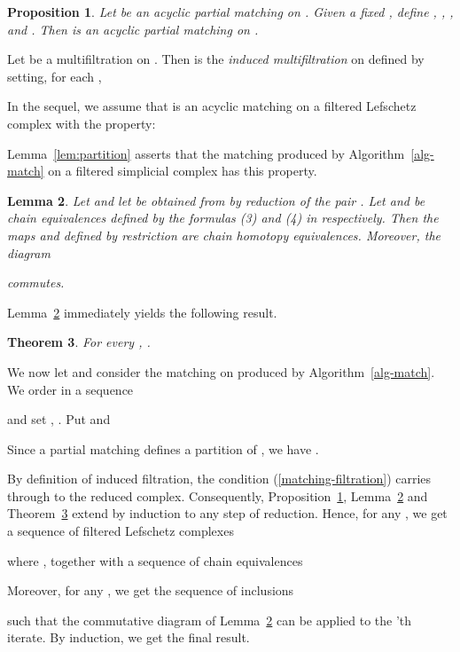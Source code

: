 \documentclass[12pt]{article}
\newtheorem{thm}{Theorem}[section]
\newtheorem{lem}[thm]{Lemma}
\newtheorem{prop}[thm]{Proposition}
\begin{document}
\begin{prop}\label{prop:reduced-matching}
Let   be an acyclic partial matching on . Given a fixed ,
define ,
, , and .
Then  is an acyclic partial matching on .
\end{prop}

Let  be a multifiltration on . Then  is the {\em induced multifiltration} on
 defined by setting, for each ,


In the sequel, we assume that  is an acyclic matching on a filtered Lefschetz complex  with the property:



Lemma~\ref{lem:partition} asserts that the matching produced by Algorithm~\ref{alg-match} on a filtered simplicial complex  has this property.

\begin{lem}\label{lem:chain-equivalence} Let  and let  be obtained from  by reduction of the pair .
Let  and  be chain equivalences defined by the formulas (3) and (4) in \cite{AlKaLa17} respectively.
Then the maps  and
 defined by restriction are chain homotopy equivalences.
Moreover, the diagram

commutes.
\end{lem}

Lemma~\ref{lem:chain-equivalence} immediately yields the following result.

\begin{thm}\label{th:reduced-filtration-iso}
For every , .
\end{thm}

We now let  and consider the matching on  produced by Algorithm~\ref{alg-match}. We order  in a sequence

and set , . Put  and

Since a partial matching defines a partition of , we have .

By definition of induced filtration, the condition (\ref{matching-filtration}) carries through to the reduced complex. Consequently, Proposition~\ref{prop:reduced-matching}, Lemma~\ref{lem:chain-equivalence} and Theorem~\ref{th:reduced-filtration-iso} extend by induction to any step of reduction. Hence, for any ,  we get a sequence of filtered Lefschetz complexes

where , together with a sequence of chain equivalences

Moreover, for any , we get the sequence of inclusions

such that the commutative diagram of Lemma~\ref{lem:chain-equivalence} can be applied to the 'th iterate. By induction, we get the final result.
\end{document}
